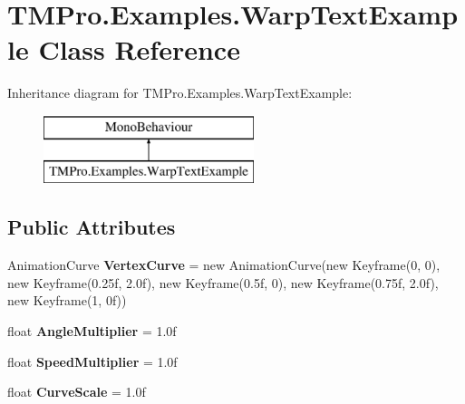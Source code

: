 \hypertarget{class_t_m_pro_1_1_examples_1_1_warp_text_example}{}\section{T\+M\+Pro.\+Examples.\+Warp\+Text\+Example Class Reference}
\label{class_t_m_pro_1_1_examples_1_1_warp_text_example}
Inheritance diagram for T\+M\+Pro.\+Examples.\+Warp\+Text\+Example\+:\begin{figure}[H]
\begin{center}
\leavevmode
\includegraphics[height=2.000000cm]{class_t_m_pro_1_1_examples_1_1_warp_text_example}
\end{center}
\end{figure}
\subsection*{Public Attributes}
\begin{DoxyCompactItemize}
\item 
\mbox{\label{class_t_m_pro_1_1_examples_1_1_warp_text_example_aa95fcb47fe116dd3890a0f92106a6602}} 
Animation\+Curve {\bfseries Vertex\+Curve} = new Animation\+Curve(new Keyframe(0, 0), new Keyframe(0.\+25f, 2.\+0f), new Keyframe(0.\+5f, 0), new Keyframe(0.\+75f, 2.\+0f), new Keyframe(1, 0f))
\item 
\mbox{\label{class_t_m_pro_1_1_examples_1_1_warp_text_example_a99104ed4ea6b2676485a40e555388f54}} 
float {\bfseries Angle\+Multiplier} = 1.\+0f
\item 
\mbox{\label{class_t_m_pro_1_1_examples_1_1_warp_text_example_ae02c88a8c8958d8a2343a75897ef400e}} 
float {\bfseries Speed\+Multiplier} = 1.\+0f
\item 
\mbox{\label{class_t_m_pro_1_1_examples_1_1_warp_text_example_aa76e772eda39a25ba1d9f033f6fc516c}} 
float {\bfseries Curve\+Scale} = 1.\+0f
\end{DoxyCompactItemize}
